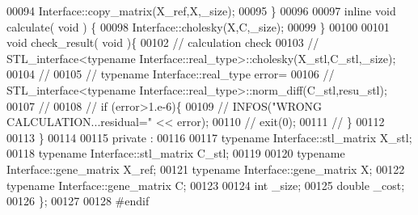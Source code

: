 \begin{DoxyCode}
00094     Interface::copy\_matrix(X\_ref,X,\_size);
00095   \}
00096 
00097   \textcolor{keyword}{inline} \textcolor{keywordtype}{void} calculate( \textcolor{keywordtype}{void} ) \{
00098       Interface::cholesky(X,C,\_size);
00099   \}
00100 
00101   \textcolor{keywordtype}{void} check\_result( \textcolor{keywordtype}{void} )\{
00102     \textcolor{comment}{// calculation check}
00103 \textcolor{comment}{//     STL\_interface<typename Interface::real\_type>::cholesky(X\_stl,C\_stl,\_size);}
00104 \textcolor{comment}{//}
00105 \textcolor{comment}{//     typename Interface::real\_type error=}
00106 \textcolor{comment}{//       STL\_interface<typename Interface::real\_type>::norm\_diff(C\_stl,resu\_stl);}
00107 \textcolor{comment}{//}
00108 \textcolor{comment}{//     if (error>1.e-6)\{}
00109 \textcolor{comment}{//       INFOS("WRONG CALCULATION...residual=" << error);}
00110 \textcolor{comment}{//       exit(0);}
00111 \textcolor{comment}{//     \}}
00112 
00113   \}
00114 
00115 private :
00116 
00117   \textcolor{keyword}{typename} Interface::stl\_matrix X\_stl;
00118   \textcolor{keyword}{typename} Interface::stl\_matrix C\_stl;
00119 
00120   \textcolor{keyword}{typename} Interface::gene\_matrix X\_ref;
00121   \textcolor{keyword}{typename} Interface::gene\_matrix X;
00122   \textcolor{keyword}{typename} Interface::gene\_matrix C;
00123 
00124   \textcolor{keywordtype}{int} \_size;
00125   \textcolor{keywordtype}{double} \_cost;
00126 \};
00127 
00128 \textcolor{preprocessor}{#endif}
\end{DoxyCode}
